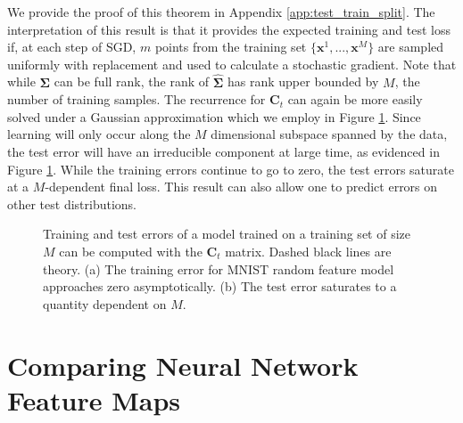 \documentclass{article} %
\def\x{\bm x}
\def\x{\mathbf x}
\def\C{\mathbf C}
\begin{document}
We provide the proof of this theorem in Appendix \ref{app:test_train_split}. The interpretation of this result is that it provides the expected training and test loss if, at each step of SGD, $m$ points from the training set $\{\x^1,...,\x^M\}$ are sampled uniformly with replacement and used to calculate a stochastic gradient. Note that while $\bm\Sigma$ can be full rank, the rank of $\bm{\hat\Sigma}$ has rank upper bounded by $M$, the number of training samples. The recurrence for $\C_t$ can again be more easily solved under a Gaussian approximation which we employ in Figure \ref{fig:test_train_split}. Since learning will only occur along the $M$ dimensional subspace spanned by the data, the test error will have an irreducible component at large time, as evidenced in Figure \ref{fig:test_train_split}. While the training errors continue to go to zero, the test errors saturate at a $M$-dependent final loss. This result can also allow one to predict errors on other test distributions. 
\begin{figure}[t]
    \centering
    \caption{Training and test errors of a model trained on a training set of size $M$ can be computed with the $\C_t$ matrix. Dashed black lines are theory. (a) The training error for MNIST random feature model approaches zero asymptotically. (b) The test error saturates to a quantity dependent on $M$. }
    \label{fig:test_train_split}
\end{figure}

\section{Comparing Neural Network Feature Maps}\label{sec:NN}
\end{document}
